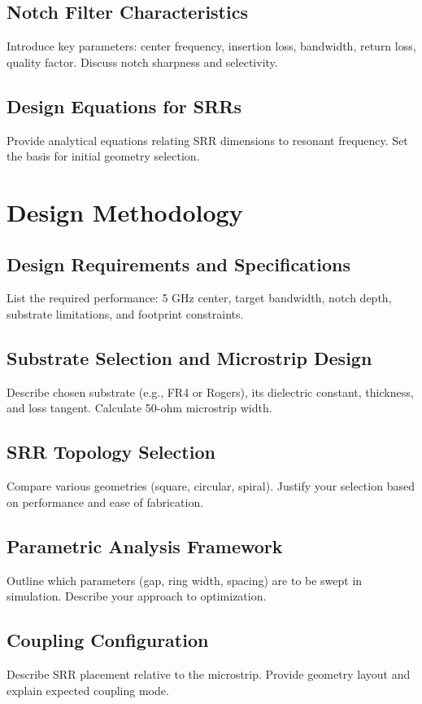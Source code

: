 \documentclass[conference]{IEEEtran}
\begin{document}
\subsection{Notch Filter Characteristics}
Introduce key parameters: center frequency, insertion loss, bandwidth, return loss, quality factor. Discuss notch sharpness and selectivity.

\subsection{Design Equations for SRRs}
Provide analytical equations relating SRR dimensions to resonant frequency. Set the basis for initial geometry selection.

\section{Design Methodology}

\subsection{Design Requirements and Specifications}
List the required performance: 5 GHz center, target bandwidth, notch depth, substrate limitations, and footprint constraints.

\subsection{Substrate Selection and Microstrip Design}
Describe chosen substrate (e.g., FR4 or Rogers), its dielectric constant, thickness, and loss tangent. Calculate 50-ohm microstrip width.

\subsection{SRR Topology Selection}
Compare various geometries (square, circular, spiral). Justify your selection based on performance and ease of fabrication.

\subsection{Parametric Analysis Framework}
Outline which parameters (gap, ring width, spacing) are to be swept in simulation. Describe your approach to optimization.

\subsection{Coupling Configuration}
Describe SRR placement relative to the microstrip. Provide geometry layout and explain expected coupling mode.
\end{document}
